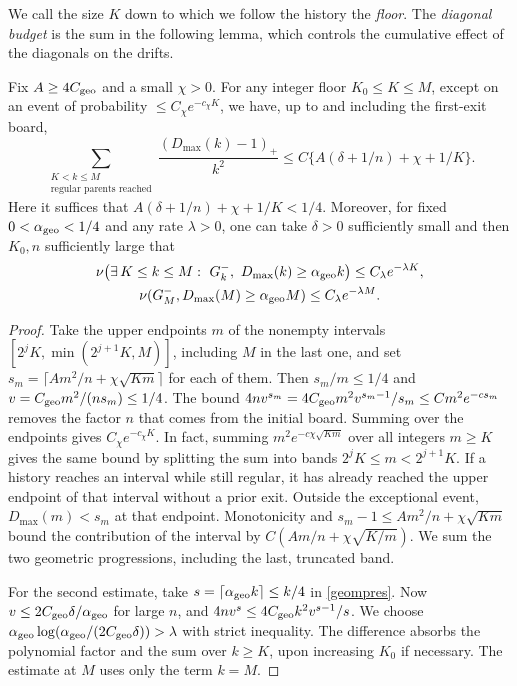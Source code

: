 We call the size $K$ down to which we follow the history the \emph{floor}. The \emph{diagonal budget} is
the sum in the following lemma, which controls the cumulative effect of the diagonals on the drifts.
\begin{lema}\label{lema:presupuesto-meso}
Fix $A\ge4C_{\rm geo}$ and a small $\chi>0$. For any integer floor $K_0\le K\le M$, except on an event of
probability $\le C_\chi e^{-c_\chi K}$, we have, up to and including the first-exit board,
\[
 \sum_{\substack{K<k\le M\\\text{regular parents reached}}}
          \frac{(D_{\max}(k)-1)_+}{k^2}
 \le C\{A(\delta+1/n)+\chi+1/K\}.
\]
Here it suffices that $A(\delta+1/n)+\chi+1/K<1/4$. Moreover, for fixed $0<\alpha_{\rm geo}<1/4$ and
any rate $\lambda>0$, one can take $\delta>0$ sufficiently small and then $K_0,n$ sufficiently large
that
\begin{gather*}
 \nu\big(\exists\,K\le k\le M:\ G_k^-,\ D_{\max}(k)\ge\alpha_{\rm geo} k\big)
 \le C_\lambda e^{-\lambda K},\\
 \nu(G_M^-,D_{\max}(M)\ge\alpha_{\rm geo} M)\le C_\lambda e^{-\lambda M}.
\end{gather*}
\end{lema}
\begin{proof}
Take the upper endpoints $m$ of the nonempty intervals $[2^jK,\min(2^{j+1}K,M)]$, including $M$ in the
last one, and set $s_m=\lceil Am^2/n+\chi\sqrt{Km}\rceil$ for each of them. Then $s_m/m\le1/4$ and
$v=C_{\rm geo}m^2/(ns_m)\le1/4$. The bound
$4nv^{s_m}=4C_{\rm geo}m^2v^{s_m-1}/s_m\le C m^2e^{-c s_m}$
removes the factor $n$ that comes from the initial board. Summing over the endpoints gives
$C_\chi e^{-c_\chi K}$. In fact, summing $m^2e^{-c\chi\sqrt{Km}}$ over all integers $m\ge K$ gives
the same bound by splitting the sum into bands $2^jK\le m<2^{j+1}K$. If a history reaches an
interval while still regular, it has already reached the upper endpoint of that interval without a
prior exit. Outside the exceptional event, $D_{\max}(m)<s_m$ at that endpoint. Monotonicity and
$s_m-1\le Am^2/n+\chi\sqrt{Km}$ bound the contribution of the interval by $C(Am/n+\chi\sqrt{K/m})$.
We sum the two geometric progressions, including the last, truncated band.

For the second estimate, take $s=\lceil\alpha_{\rm geo} k\rceil\le k/4$ in \eqref{geompres}. Now
$v\le 2C_{\rm geo}\delta/\alpha_{\rm geo}$ for large $n$, and
$4nv^s\le4C_{\rm geo} k^2v^{s-1}/s$. We choose
$\alpha_{\rm geo}\log(\alpha_{\rm geo}/(2C_{\rm geo}\delta))>\lambda$ with strict inequality. The
difference absorbs the
polynomial factor and the sum over $k\ge K$, upon increasing $K_0$ if necessary. The estimate at $M$ uses
only the term $k=M$.
\end{proof}

